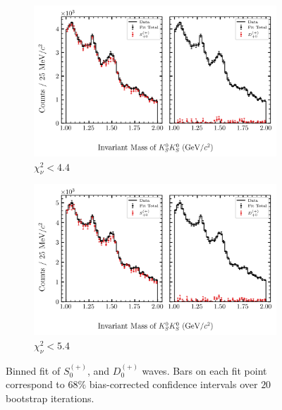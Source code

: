 \begin{figure}[htbp]
    \begin{subfigure}{0.45\textwidth}
        \includegraphics[width=\linewidth]{figures/binned_fit_chisqdof_4.4_splot_D_1s_2b_phase_factor_waves487_uncertainty_bootstrap-CI-BC.png}
        \caption{$\chi^2_\nu < 4.4$}
    \end{subfigure}
    \hfill
    \begin{subfigure}{0.45\textwidth}
        \includegraphics[width=\linewidth]{figures/binned_fit_chisqdof_5.4_splot_D_1s_2b_phase_factor_waves487_uncertainty_bootstrap-CI-BC.png}
        \caption{$\chi^2_\nu < 5.4$}
    \end{subfigure}

    \caption{Binned fit of $S_{0}^{(+)}$, and $D_{0}^{(+)}$ waves. Bars on each fit point correspond to $68\%$ bias-corrected confidence intervals over $20$ bootstrap iterations.}
    \label{fig:binned-fit-all-Sp-D0p}
\end{figure}

